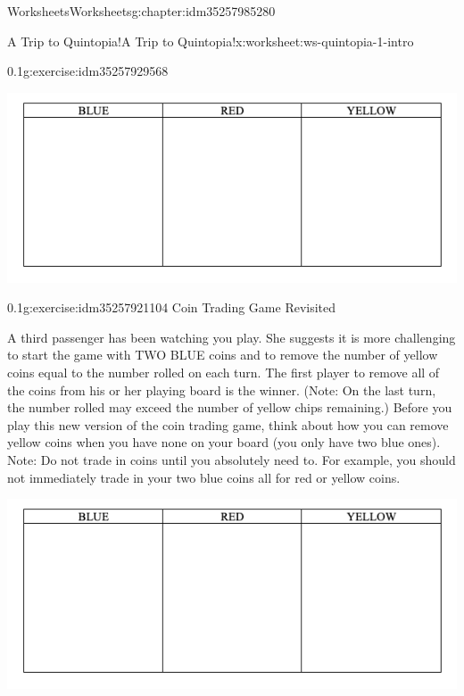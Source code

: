 \documentclass[twoside,11pt,]{book}
\begin{document}
\begin{chapterptx}{Worksheets}{}{Worksheets}{}{}{g:chapter:idm35257985280}
\begin{worksheet-section-numberless}{A Trip to Quintopia!}{}{A Trip to Quintopia!}{}{}{x:worksheet:ws-quintopia-1-intro}
\begin{divisionexercise}{1}{}{0.1}{g:exercise:idm35257929568}
\begin{sidebyside}{1}{0}{0}{0}
\begin{sbspanel}{1}
\includegraphics[width=1\linewidth]{images/quintopia-table.png}
\end{sbspanel}%
\end{sidebyside}%
\end{divisionexercise}%
\clearpage
\begin{divisionexercise}{2}{}{0.1}{g:exercise:idm35257921104}%
Coin Trading Game Revisited%
\par
A third passenger has been watching you play.  She suggests it is more challenging to start the game with TWO BLUE coins and to remove the number of yellow coins equal to the number rolled on each turn.  The first player to remove all of the coins from his or her playing board is the winner.  (Note: On the last turn, the number rolled may exceed the number of yellow chips remaining.)  Before you play this new version of the coin trading game, think about how you can remove yellow coins when you have none on your board (you only have two blue ones).  Note: Do not trade in coins until you absolutely need to.  For example, you should not immediately trade in your two blue coins all for red or yellow coins.%
\begin{sidebyside}{1}{0}{0}{0}%
\begin{sbspanel}{1}%
\includegraphics[width=1\linewidth]{images/quintopia-table.png}
\end{sbspanel}%
\end{sidebyside}%
%
\begin{description}

\end{description}
\end{divisionexercise}
\end{worksheet-section-numberless}
\end{chapterptx}
\end{document}
